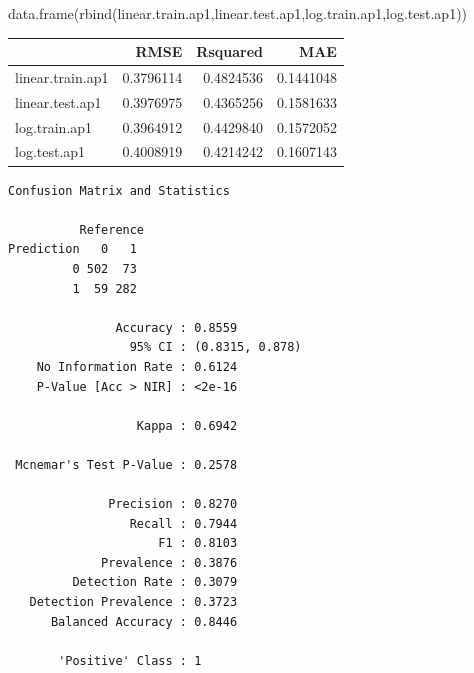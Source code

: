 \documentclass[
  letterpaper,
  DIV=11,
  numbers=noendperiod]{scrartcl}
\newenvironment{Shaded}{\begin{snugshade}}{\end{snugshade}}
\newcommand{\AttributeTok}[1]{\textcolor[rgb]{0.40,0.45,0.13}{#1}}
\newcommand{\FunctionTok}[1]{\textcolor[rgb]{0.28,0.35,0.67}{#1}}
\newcommand{\NormalTok}[1]{\textcolor[rgb]{0.00,0.23,0.31}{#1}}
\newcommand{\OtherTok}[1]{\textcolor[rgb]{0.00,0.23,0.31}{#1}}
\newcommand{\SpecialCharTok}[1]{\textcolor[rgb]{0.37,0.37,0.37}{#1}}
\newcommand{\StringTok}[1]{\textcolor[rgb]{0.13,0.47,0.30}{#1}}
\begin{document}
\begin{Shaded}
\begin{Highlighting}[]
\FunctionTok{data.frame}\NormalTok{(}\FunctionTok{rbind}\NormalTok{(linear.train.ap1,linear.test.ap1,log.train.ap1,log.test.ap1))}
\end{Highlighting}
\end{Shaded}

\begin{longtable}[]{@{}lrrr@{}}
\toprule\noalign{}
& RMSE & Rsquared & MAE \\
\midrule\noalign{}
\endhead
\bottomrule\noalign{}
\endlastfoot
linear.train.ap1 & 0.3796114 & 0.4824536 & 0.1441048 \\
linear.test.ap1 & 0.3976975 & 0.4365256 & 0.1581633 \\
log.train.ap1 & 0.3964912 & 0.4429840 & 0.1572052 \\
log.test.ap1 & 0.4008919 & 0.4214242 & 0.1607143 \\
\end{longtable}

\begin{Shaded}
\end{Shaded}

\begin{verbatim}
Confusion Matrix and Statistics

          Reference
Prediction   0   1
         0 502  73
         1  59 282
                                         
               Accuracy : 0.8559         
                 95% CI : (0.8315, 0.878)
    No Information Rate : 0.6124         
    P-Value [Acc > NIR] : <2e-16         
                                         
                  Kappa : 0.6942         
                                         
 Mcnemar's Test P-Value : 0.2578         
                                         
              Precision : 0.8270         
                 Recall : 0.7944         
                     F1 : 0.8103         
             Prevalence : 0.3876         
         Detection Rate : 0.3079         
   Detection Prevalence : 0.3723         
      Balanced Accuracy : 0.8446         
                                         
       'Positive' Class : 1              
                                         
\end{verbatim}
\end{document}
